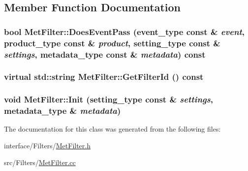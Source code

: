 \subsection{Member Function Documentation}
\hypertarget{classMetFilter_a341f5c453bdcde081b8e524a9c8dfdc3}{
\subsubsection[{DoesEventPass}]{\setlength{\rightskip}{0pt plus 5cm}bool MetFilter::DoesEventPass (event\_\-type const \& {\em event}, \/  product\_\-type const \& {\em product}, \/  setting\_\-type const \& {\em settings}, \/  metadata\_\-type const \& {\em metadata}) const}}
\label{classMetFilter_a341f5c453bdcde081b8e524a9c8dfdc3}
\hypertarget{classMetFilter_a87ef009255db01cd6c5b36f8304c9366}{
\subsubsection[{GetFilterId}]{\setlength{\rightskip}{0pt plus 5cm}virtual std::string MetFilter::GetFilterId () const}}
\label{classMetFilter_a87ef009255db01cd6c5b36f8304c9366}
\hypertarget{classMetFilter_a0021979947fb228dde496d0a7c4c16d1}{
\subsubsection[{Init}]{\setlength{\rightskip}{0pt plus 5cm}void MetFilter::Init (setting\_\-type const \& {\em settings}, \/  metadata\_\-type \& {\em metadata})}}
\label{classMetFilter_a0021979947fb228dde496d0a7c4c16d1}


The documentation for this class was generated from the following files:\begin{DoxyCompactItemize}
\item 
interface/Filters/\hyperlink{MetFilter_8h}{MetFilter.h}\item 
src/Filters/\hyperlink{MetFilter_8cc}{MetFilter.cc}\end{DoxyCompactItemize}

